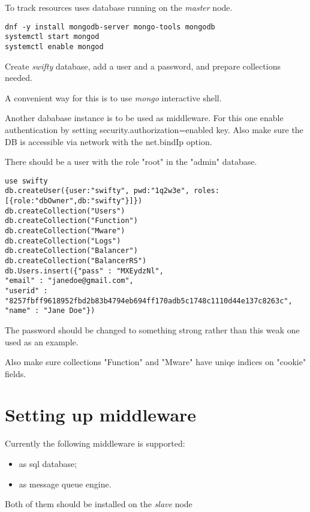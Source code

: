 To track resources  uses
 database
running on the \emph{master} node.

\begin{lstlisting}
dnf -y install mongodb-server mongo-tools mongodb
systemctl start mongod
systemctl enable mongod
\end{lstlisting}

Create \emph{swifty} database, add a user and a password,
and prepare collections needed.

A convenient way for this is to use \emph{mongo} interactive shell.

Another dababase instance is to be used as middleware. For
this one enable authentication by setting security.authorization=enabled
key. Also make sure the DB is accessible via network with the net.bindIp
option.

There should be a user with the role "root" in the "admin" database.

\begin{lstlisting}
use swifty
db.createUser({user:"swifty", pwd:"1q2w3e", roles:[{role:"dbOwner",db:"swifty"}]})
db.createCollection("Users")
db.createCollection("Function")
db.createCollection("Mware")
db.createCollection("Logs")
db.createCollection("Balancer")
db.createCollection("BalancerRS")
db.Users.insert({"pass" : "MXEydzNl",
"email" : "janedoe@gmail.com",
"userid" : "8257fbff9618952fbd2b83b4794eb694ff170adb5c1748c1110d44e137c8263c",
"name" : "Jane Doe"})
\end{lstlisting}

The password should be changed to something strong rather than
this weak one used as an example.

Also make sure collections "Function" and "Mware" have uniqe indices
on "cookie" fields.

\section{Setting up middleware}
\label{sec:setup-mware}

Currently the following middleware is supported:
\begin{itemize}
\item{ as sql database;}
\item{ as message queue engine.}
\end{itemize}

Both of them should be installed on the \emph{slave} node

